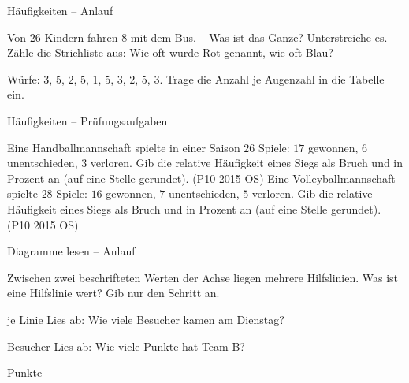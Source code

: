 \setcounter{aufgabe}{0}

\begin{aufgabe}{Häufigkeiten – Anlauf}
\begin{teile}
\teil Von $26$ Kindern fahren $8$ mit dem Bus. – Was ist das Ganze? Unterstreiche es.
\teil Zähle die Strichliste aus: Wie oft wurde Rot genannt, wie oft Blau?

\teil Würfe: $3$, $5$, $2$, $5$, $1$, $5$, $3$, $2$, $5$, $3$. Trage die Anzahl je Augenzahl in die Tabelle ein.

\end{teile}
\end{aufgabe}

\begin{aufgabe}{Häufigkeiten – Prüfungsaufgaben}
\begin{teile}
\teil Eine Handballmannschaft spielte in einer Saison $26$ Spiele: $17$ gewonnen, $6$ unentschieden, $3$ verloren. Gib die relative Häufigkeit eines Siegs als Bruch und in Prozent an (auf eine Stelle gerundet). \hfill (P10 2015 OS)
\teil Eine Volleyballmannschaft spielte $28$ Spiele: $16$ gewonnen, $7$ unentschieden, $5$ verloren. Gib die relative Häufigkeit eines Siegs als Bruch und in Prozent an (auf eine Stelle gerundet). \hfill (P10 2015 OS)
\end{teile}
\end{aufgabe}

\begin{aufgabe}{Diagramme lesen – Anlauf}
\begin{teile}
\teil Zwischen zwei beschrifteten Werten der Achse liegen mehrere Hilfslinien. Was ist eine Hilfslinie wert? Gib nur den Schritt an.

\leerfeld je Linie
\teil Lies ab: Wie viele Besucher kamen am Dienstag?

\leerfeld Besucher
\teil Lies ab: Wie viele Punkte hat Team B?

\leerfeld Punkte
\end{teile}
\end{aufgabe}

